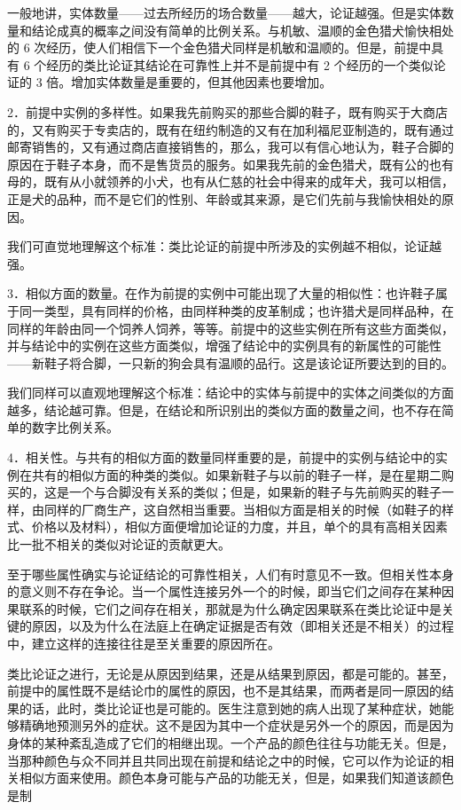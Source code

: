一般地讲，实体数量——过去所经历的场合数量——越大，论证越强。但是实体数量和结论成真的概率之间没有简单的比例关系。与机敏、温顺的金色猎犬愉快相处的 6 次经历，使人们相信下一个金色猎犬同样是机敏和温顺的。但是，前提中具有 6 个经历的类比论证其结论在可靠性上并不是前提中有 2 个经历的一个类似论证的 3 倍。增加实体数量是重要的，但其他因素也要增加。

2．前提中实例的多样性。如果我先前购买的那些合脚的鞋子，既有购买于大商店的，又有购买于专卖店的，既有在纽约制造的又有在加利福尼亚制造的，既有通过邮寄销售的，又有通过商店直接销售的，那么，我可以有信心地认为，鞋子合脚的原因在于鞋子本身，而不是售货员的服务。如果我先前的金色猎犬，既有公的也有母的，既有从小就领养的小犬，也有从仁慈的社会中得来的成年犬，我可以相信，正是犬的品种，而不是它们的性别、年龄或其来源，是它们先前与我愉快相处的原因。

我们可直觉地理解这个标准：类比论证的前提中所涉及的实例越不相似，论证越强。

3．相似方面的数量。在作为前提的实例中可能出现了大量的相似性：也许鞋子属于同一类型，具有同样的价格，由同样种类的皮革制成；也许猎犬是同样品种，在同样的年龄由同一个饲养人饲养，等等。前提中的这些实例在所有这些方面类似，并与结论中的实例在这些方面类似，增强了结论中的实例具有的新属性的可能性——新鞋子将合脚，一只新的狗会具有温顺的品行。这是该论证所要达到的目的。

我们同样可以直观地理解这个标准：结论中的实体与前提中的实体之间类似的方面越多，结论越可靠。但是，在结论和所识别出的类似方面的数量之间，也不存在简单的数字比例关系。

4．相关性。与共有的相似方面的数量同样重要的是，前提中的实例与结论中的实例在共有的相似方面的种类的类似。如果新鞋子与以前的鞋子一样，是在星期二购买的，这是一个与合脚没有关系的类似；但是，如果新的鞋子与先前购买的鞋子一样，由同样的厂商生产，这自然相当重要。当相似方面是相关的时候（如鞋子的样式、价格以及材料），相似方面便增加论证的力度，并且，单个的具有高相关因素比一批不相关的类似对论证的贡献更大。

至于哪些属性确实与论证结论的可靠性相关，人们有时意见不一致。但相关性本身的意义则不存在争论。当一个属性连接另外一个的时候，即当它们之间存在某种因果联系的时候，它们之间存在相关，那就是为什么确定因果联系在类比论证中是关键的原因，以及为什么在法庭上在确定证据是否有效（即相关还是不相关）的过程中，建立这样的连接往往是至关重要的原因所在。

类比论证之进行，无论是从原因到结果，还是从结果到原因，都是可能的。甚至，前提中的属性既不是结论巾的属性的原因，也不是其结果，而两者是同一原因的结果的话，此时，类比论证也是可能的。医生注意到她的病人出现了某种症状，她能够精确地预测另外的症状。这不是因为其中一个症状是另外一个的原因，而是因为身体的某种紊乱造成了它们的相继出现。一个产品的颜色往往与功能无关。但是，当那种颜色与众不同并且共同出现在前提和结论之中的时候，它可以作为论证的相关相似方面来使用。颜色本身可能与产品的功能无关，但是，如果我们知道该颜色是制

